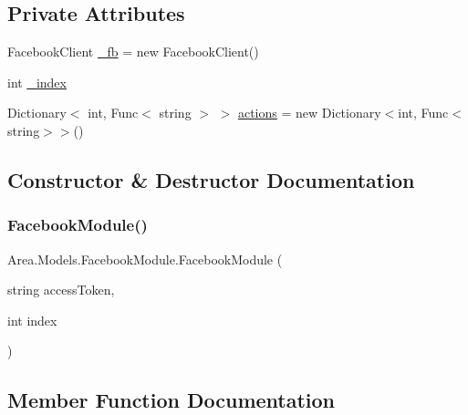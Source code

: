 \subsection*{Private Attributes}
\begin{DoxyCompactItemize}
\item 
Facebook\+Client \mbox{\hyperlink{classArea_1_1Models_1_1FacebookModule_a01ca890a1b43dd2765a55e8dbe1b6708}{\+\_\+fb}} = new Facebook\+Client()
\item 
int \mbox{\hyperlink{classArea_1_1Models_1_1FacebookModule_a3c45be1580ff5b5853497647af595c36}{\+\_\+index}}
\item 
Dictionary$<$ int, Func$<$ string $>$ $>$ \mbox{\hyperlink{classArea_1_1Models_1_1FacebookModule_a6fbe12ae79bf0e6d3a4b24048c4736a6}{actions}} = new Dictionary$<$int, Func$<$string$>$$>$()
\end{DoxyCompactItemize}


\subsection{Constructor \& Destructor Documentation}
\mbox{\label{classArea_1_1Models_1_1FacebookModule_ae316294726eb340c34653d405b244682}} 
\subsubsection{\texorpdfstring{Facebook\+Module()}{FacebookModule()}}
{\footnotesize\ttfamily Area.\+Models.\+Facebook\+Module.\+Facebook\+Module (\begin{DoxyParamCaption}\item[{string}]{access\+Token,  }\item[{int}]{index }\end{DoxyParamCaption})\hspace{0.3cm}{\ttfamily [inline]}}



\subsection{Member Function Documentation}
\mbox{\label{classArea_1_1Models_1_1FacebookModule_a2945ca6108f012ea53ea172e97bcd267}} 
